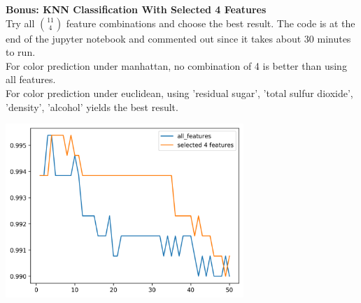 \documentclass[12pt]{article}
\begin{document}
\begin{figure}[H]
\captionsetup[subfigure]{labelformat=empty}
\centering
{}
\end{figure}
\noindent
\textbf{Bonus: KNN Classification With Selected 4 Features}\\
Try all ${11 \choose 4}$ feature combinations and choose the best result. The code is at the end of the jupyter notebook and commented out since it takes about 30 minutes to run.\\
For color prediction under manhattan, no combination of 4 is better than using all features.\\
For color prediction under euclidean, using 'residual sugar', 'total sulfur dioxide', 'density', 'alcohol' yields the best result.
\begin{center}
    \includegraphics[width=9cm]{./select4features/color_e.png}
\end{center}
\end{document}
